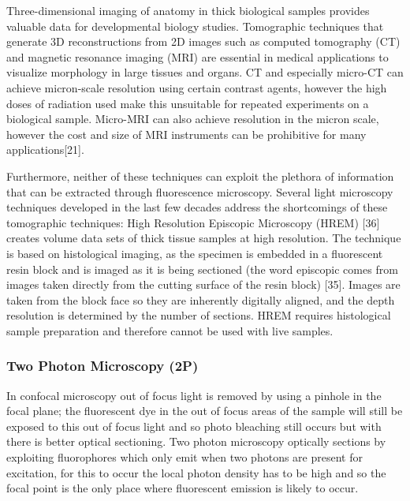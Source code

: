 
Three-dimensional imaging of anatomy in thick biological samples provides valuable data for developmental biology studies.
Tomographic techniques that generate 3D reconstructions from 2D images such as computed tomography (CT) and magnetic resonance imaging (MRI) are essential in medical applications to visualize morphology in large tissues and organs.
CT and especially micro-CT can achieve micron-scale resolution using certain contrast agents, however the high doses of radiation used make this unsuitable for repeated experiments on a biological sample.
Micro-MRI can also achieve resolution in the micron scale, however the cost and size of MRI instruments can be prohibitive for many applications[21].

Furthermore, neither of these techniques can exploit the plethora of information that can be extracted through fluorescence microscopy.
Several light microscopy techniques developed in the last few decades address the shortcomings of these tomographic techniques:
High Resolution Episcopic Microscopy (HREM) [36] creates volume data sets of thick tissue samples at high resolution.
The technique is based on histological imaging, as the specimen is embedded in a fluorescent resin block and is imaged as it is being sectioned (the word episcopic comes from images taken directly from the cutting surface of the resin
block) [35].
Images are taken from the block face so they are inherently digitally aligned, and the depth resolution is determined by the number of sections. HREM requires histological sample preparation and therefore cannot be used with live samples.

\subsubsection{Two Photon Microscopy (2P)}
In confocal microscopy out of focus light is removed by using a pinhole in the focal plane; the fluorescent dye in the out of focus areas of the sample will still be exposed to this out of focus light and so photo bleaching still occurs but with there is better optical sectioning\cite{Helmchen2005}.
Two photon microscopy optically sections by exploiting fluorophores which only emit when two photons are present for excitation, for this to occur the local photon density has to be high and so the focal point is the only place where fluorescent emission is likely to occur.

